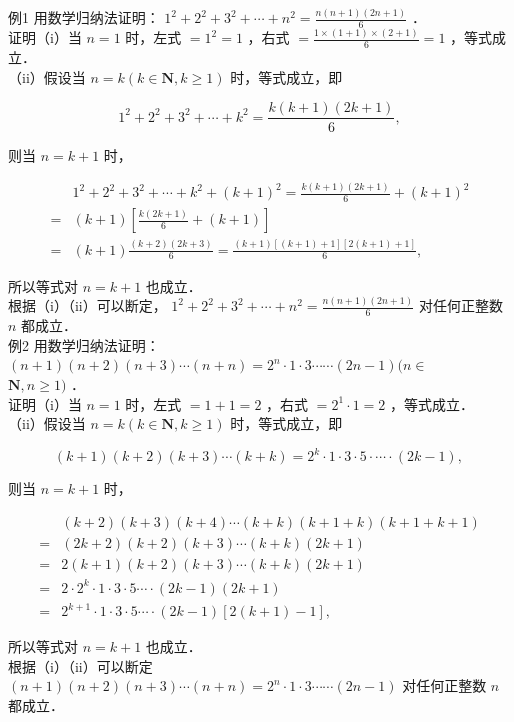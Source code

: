 \documentclass[10pt]{article}
\begin{document}
例1 用数学归纳法证明： \(1^{2}+2^{2}+3^{2}+\cdots+n^{2}=\frac{n(n+1)(2 n+1)}{6}\) ．\\
证明（i）当 \(n=1\) 时，左式 \(=1^{2}=1\) ，右式 \(=\frac{1 \times(1+1) \times(2+1)}{6}=1\) ，等式成立．\\
（ii）假设当 \(n=k(k \in \mathbf{N}, k \geqslant 1)\) 时，等式成立，即

\[
1^{2}+2^{2}+3^{2}+\cdots+k^{2}=\frac{k(k+1)(2 k+1)}{6},
\]

则当 \(n=k+1\) 时，

\[
\begin{aligned}
& 1^{2}+2^{2}+3^{2}+\cdots+k^{2}+(k+1)^{2}=\frac{k(k+1)(2 k+1)}{6}+(k+1)^{2} \\
= & (k+1)\left[\frac{k(2 k+1)}{6}+(k+1)\right] \\
= & (k+1) \frac{(k+2)(2 k+3)}{6}=\frac{(k+1)[(k+1)+1][2(k+1)+1]}{6},
\end{aligned}
\]

所以等式对 \(n=k+1\) 也成立．\\
根据（i）（ii）可以断定， \(1^{2}+2^{2}+3^{2}+\cdots+n^{2}=\frac{n(n+1)(2 n+1)}{6}\) 对任何正整数 \(n\) 都成立．\\
例2 用数学归纳法证明：\((n+1)(n+2)(n+3) \cdots(n+n)=2^{n} \cdot 1 \cdot 3 \cdots \cdots(2 n-1)(n \in\)\\
\(\mathbf{N}, n \geqslant 1)\) ．\\
证明（i）当 \(n=1\) 时，左式 \(=1+1=2\) ，右式 \(=2^{1} \cdot 1=2\) ，等式成立．\\
（ii）假设当 \(n=k(k \in \mathbf{N}, k \geqslant 1)\) 时，等式成立，即

\[
(k+1)(k+2)(k+3) \cdots(k+k)=2^{k} \cdot 1 \cdot 3 \cdot 5 \cdot \cdots \cdot(2 k-1) \text {, }
\]

则当 \(n=k+1\) 时，

\[
\begin{aligned}
& (k+2)(k+3)(k+4) \cdots(k+k)(k+1+k)(k+1+k+1) \\
= & (2 k+2)(k+2)(k+3) \cdots(k+k)(2 k+1) \\
= & 2(k+1)(k+2)(k+3) \cdots(k+k)(2 k+1) \\
= & 2 \cdot 2^{k} \cdot 1 \cdot 3 \cdot 5 \cdots \cdot(2 k-1)(2 k+1) \\
= & 2^{k+1} \cdot 1 \cdot 3 \cdot 5 \cdots \cdot(2 k-1)[2(k+1)-1],
\end{aligned}
\]

所以等式对 \(n=k+1\) 也成立．\\
根据（i）（ii）可以断定 \((n+1)(n+2)(n+3) \cdots(n+n)=2^{n} \cdot 1 \cdot 3 \cdots \cdots(2 n-1)\) 对任何正整数 \(n\) 都成立．
\end{document}
